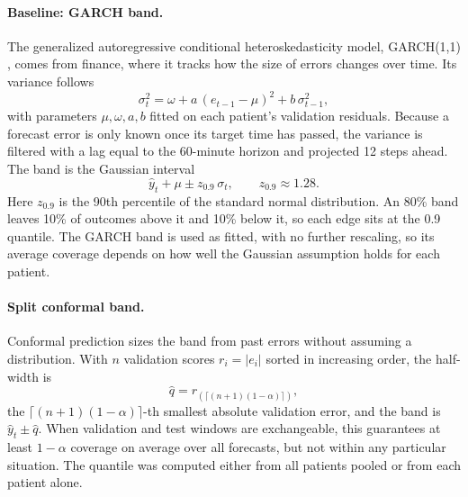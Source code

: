 \paragraph{Baseline: GARCH band.} The generalized autoregressive conditional heteroskedasticity model, GARCH(1,1) \parencite{bollerslev1986garch}, comes from finance, where it tracks how the size of errors changes over time. Its variance follows
\begin{equation}
\sigma_t^2 = \omega + a\,(e_{t-1} - \mu)^2 + b\,\sigma_{t-1}^2,
\end{equation}
with parameters $\mu, \omega, a, b$ fitted on each patient's validation residuals. Because a forecast error is only known once its target time has passed, the variance is filtered with a lag equal to the 60-minute horizon and projected 12 steps ahead. The band is the Gaussian interval
\begin{equation}
\hat{y}_t + \mu \pm z_{0.9}\,\sigma_t, \qquad z_{0.9} \approx 1.28 .
\end{equation}
Here $z_{0.9}$ is the 90th percentile of the standard normal distribution. An 80\% band leaves 10\% of outcomes above it and 10\% below it, so each edge sits at the 0.9 quantile. The GARCH band is used as fitted, with no further rescaling, so its average coverage depends on how well the Gaussian assumption holds for each patient.

\paragraph{Split conformal band.} Conformal prediction \parencite{vovk2005alrw} sizes the band from past errors without assuming a distribution. With $n$ validation scores $r_i = |e_i|$ sorted in increasing order, the half-width is
\begin{equation}
\hat{q} = r_{(\lceil (n+1)(1-\alpha) \rceil)},
\end{equation}
the $\lceil (n+1)(1-\alpha) \rceil$-th smallest absolute validation error, and the band is $\hat{y}_t \pm \hat{q}$. When validation and test windows are exchangeable, this guarantees at least $1-\alpha$ coverage on average over all forecasts, but not within any particular situation. The quantile was computed either from all patients pooled or from each patient alone.

